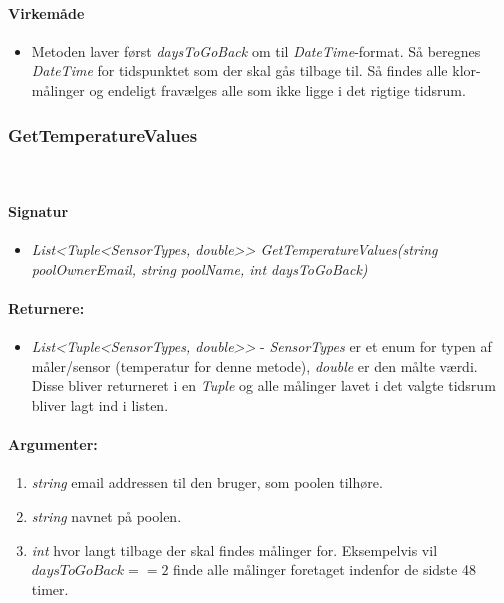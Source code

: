 \paragraph{Virkemåde}
\begin{itemize}
	\item Metoden laver først \textit{daysToGoBack} om til \textit{DateTime}-format. Så beregnes \textit{DateTime} for tidspunktet som der skal gås tilbage til. Så findes alle klor-målinger og endeligt fravælges alle som ikke ligge i det rigtige tidsrum.
\end{itemize}








\subsubsection{GetTemperatureValues}\ %


\paragraph{Signatur}
\begin{itemize}
	\item \textit{List<Tuple<SensorTypes, double>> GetTemperatureValues(string poolOwnerEmail, string poolName, int daysToGoBack)}
\end{itemize}

\paragraph{Returnere:}
\begin{itemize}
	\item \textit{List<Tuple<SensorTypes, double>>} - \textit{SensorTypes} er et enum for typen af måler/sensor (temperatur for denne metode), \textit{double} er den målte værdi. Disse bliver returneret i en \textit{Tuple} og alle målinger lavet i det valgte tidsrum bliver lagt ind i listen.
\end{itemize}

\paragraph{Argumenter:}
\begin{enumerate}
	\item \textit{string} email addressen til den bruger, som poolen tilhøre.
	\item \textit{string} navnet på poolen.
	\item \textit{int} hvor langt tilbage der skal findes målinger for. Eksempelvis vil $daysToGoBack == 2$ finde alle målinger foretaget indenfor de sidste 48 timer.
\end{enumerate}

